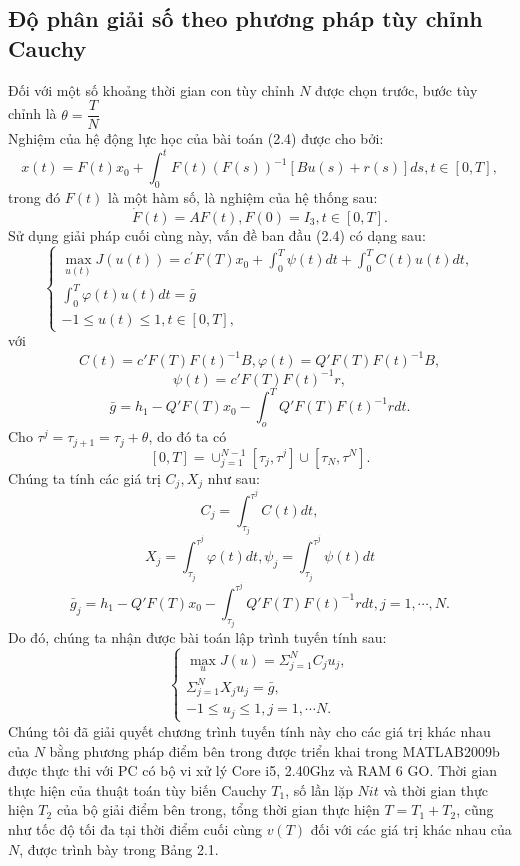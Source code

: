 \documentclass[12pt,a4paper]{report}
\begin{document}
	\subsection{Độ phân giải số theo phương pháp tùy chỉnh Cauchy}
	Đối với một số khoảng thời gian con tùy chỉnh $N$ được chọn trước, bước tùy chỉnh là $\theta = \dfrac{T}{N}$\\
	Nghiệm của hệ động lực học của bài toán (2.4) được cho bởi:
	\begin{equation}
		x(t) = F(t)x_0 + \int_{0}^{t}F(t)(F(s))^{-1}[Bu(s)+r(s)]ds, t \in [0, T],
	\end{equation} trong đó $F(t)$ là một hàm số, là nghiệm của hệ thống sau:
	$$\dot{F}(t) = AF(t), F(0)=I_3, t \in[0, T].$$ Sử dụng giải pháp cuối cùng này, vấn đề ban đầu (2.4) có dạng sau:
	\begin{equation}
		\begin{cases}
			\max_{u(t)} J(u(t)) = c^{'}F(T)x_0 + \int_{0}^{T}\psi(t)dt + \int_{0}^{T}C(t)u(t)dt, \\ \int_{0}^{T}\varphi(t)u(t)dt = \bar{g} \\ -1 \leq u(t) \leq 1, t \in [0, T],
		\end{cases}
	\end{equation} với $$
	C(t) = c'F(T)F(t)^{-1}B, \varphi(t) = Q'F(T)F(t)^{-1}B,  $$ $$\psi(t) = c'F(T)F(t)^{-1}r, $$$$ \bar{g} = h_1 - Q'F(T)x_0 - \int_{o}^{T}Q'F(T)F(t)^{-1}rdt.
$$ Cho $\tau^j = \tau_{j+1} = \tau_j + \theta$, do đó ta có $$[0, T] = \cup_{j=1}^{N-1}[\tau_j, \tau^j]\cup[\tau_N, \tau^N].$$ Chúng ta tính các giá trị $C_j, X_j$ như sau: 
$$C_j = \int_{\tau_j}^{\tau^j}C(t)dt,$$$$X_j = \int_{\tau_j}^{\tau^j}\varphi(t)dt, \psi_j=\int_{\tau_j}^{\tau^j}\psi(t)dt$$$$\bar{g}_j=h_1 - Q'F(T)x_0 - \int_{\tau_j}^{\tau^j}Q'F(T)F(t)^{-1}rdt, j = 1, \cdots, N.$$ Do đó, chúng ta nhận được bài toán lập trình tuyến tính sau: 
\begin{equation}
	\begin{cases}
		\max_u J(u) = \Sigma_{j=1}^{N}C_ju_j, \\\Sigma_{j=1}^{N}X_ju_j = \bar{g}, \\ -1 \leq u_j \leq 1, j = 1, \cdots N.
	\end{cases}
\end{equation}
Chúng tôi đã giải quyết chương trình tuyến tính này cho các giá trị khác nhau của $N$ bằng phương pháp điểm bên trong được triển khai trong MATLAB2009b được thực thi với PC có bộ vi xử lý Core i5, 2.40Ghz và RAM 6 GO. Thời gian thực hiện của thuật toán tùy biến Cauchy $T_1$, số lần lặp $Nit$ và thời gian thực hiện $T_2$ của bộ giải điểm bên trong, tổng thời gian thực hiện $T = T_1 + T_2$, cũng như tốc độ tối đa tại thời điểm cuối cùng $v(T)$ đối với các giá trị khác nhau của $N$, được trình bày trong Bảng 2.1.
\end{document}
